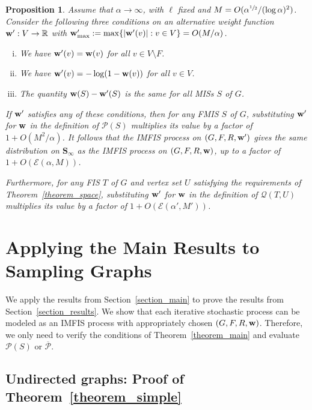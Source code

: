 \documentclass{article}
\theoremstyle{plain}
\theoremstyle{remark}
\theoremstyle{plain}
\newtheorem{proposition}[theorem]{Proposition}
\numberwithin{equation}{section}
\renewcommand{\b}{{\bf{w}}}
\begin{document}
	\begin{proposition}\label{proposition_leniency}
		Assume that $\alpha\to\infty$, with $\ell$ fixed and $M=O(\alpha^{\sfrac12}/(\log\alpha)^2)$. Consider the following three conditions on an alternative weight function $\b':V\to\mathbb{R}$ with $\b'_{\max}:=\max\{|\b'(v)|:v\in V\}=O(M/\alpha)$.
		\begin{enumerate}[(i)]
			\item\label{proposition_leniency_f} We have $\b'(v)=\b(v)$ for all $v\in V\setminus F$.
			\item\label{proposition_leniency_log} We have $\b'(v)=-\log(1-\b(v))$ for all $v\in V$.
			\item\label{proposition_leniency_b} The quantity $\b(S)-\b'(S)$ is the same for all MISs $S$ of $G$. 
		\end{enumerate}
		If $\b'$ satisfies any of these conditions, then for any FMIS $S$ of $G$, substituting $\b'$ for $\b$ in the definition of $\mathscr{P}(S)$ multiplies its value by a factor of $1+O(M^2/\alpha)$. It follows that the IMFIS process on $(G,F,R,\b')$ gives the same distribution on $\boldsymbol{S}_{\infty}$ as the IMFIS process on $(G,F,R,\b)$, up to a factor of $1+O(\mathscr{E}(\alpha,M))$.
		
		Furthermore, for any FIS $T$ of $G$ and vertex set $U$ satisfying the requirements of Theorem~\ref{theorem_space}, substituting $\b'$ for $\b$ in the definition of $\mathscr{Q}(T,U)$ multiplies its value by a factor of $1+O(\mathscr{E}(\alpha',M'))$.
	\end{proposition}
	
	
	\section[Applying the Main Results to Sampling Graphs]{\hspace{-0.35cm}Applying the Main Results to Sampling Graphs}\label{section_applications}
	
	
	We apply the results from Section~\ref{section_main} to prove the results from Section~\ref{section_results}. We show that each iterative stochastic process can be modeled as an IMFIS process with appropriately chosen $(G,F,R,\b)$. Therefore, we only need to verify the conditions of Theorem~\ref{theorem_main} and evaluate $\mathscr{P}(S)$ or $\overline{\mathscr{P}}$.
	
	\subsection{Undirected graphs: Proof of Theorem~\ref{theorem_simple}}\label{subsection_applications_simple}
	
\end{document}
